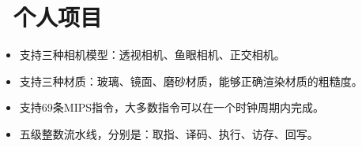 \documentclass{resume}
\begin{document}

\section{\texorpdfstring{\faGithubAlt\ 个人项目}{个人项目}}
\begin{itemize}
  \item 支持三种相机模型：透视相机、鱼眼相机、正交相机。
  \item 支持三种材质：玻璃、镜面、磨砂材质，能够正确渲染材质的粗糙度。
\end{itemize}

\begin{itemize}
  \item 支持69条MIPS指令，大多数指令可以在一个时钟周期内完成。
  \item 五级整数流水线，分别是：取指、译码、执行、访存、回写。
\end{itemize}


\end{document}

